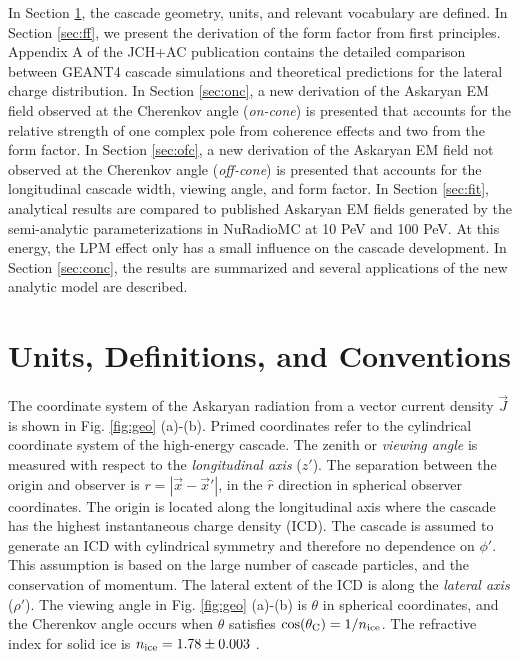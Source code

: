 \documentclass[amsmath,amssymb,aps,prd,10pt,twocolumn]{revtex4}
\begin{document}
In Section \ref{sec:unit}, the cascade geometry, units, and relevant vocabulary are defined.  In Section \ref{sec:ff}, we present the derivation of the form factor from first principles.  Appendix A of the JCH+AC publication contains the detailed comparison between GEANT4 cascade simulations and theoretical predictions for the lateral charge distribution.  In Section \ref{sec:onc}, a new derivation of the Askaryan EM field observed at the Cherenkov angle (\textit{on-cone}) is presented that accounts for the relative strength of one complex pole from coherence effects and two from the form factor.  In Section \ref{sec:ofc}, a new derivation of the Askaryan EM field not observed at the Cherenkov angle (\textit{off-cone}) is presented that accounts for the longitudinal cascade width, viewing angle, and form factor.  In Section \ref{sec:fit}, analytical results are compared to published Askaryan EM fields generated by the semi-analytic parameterizations in NuRadioMC \cite{10.1140/epjc/s10052-020-7612-8} at 10 PeV and 100 PeV.  At this energy, the LPM effect only has a small influence on the cascade development.  In Section \ref{sec:conc}, the results are summarized and several applications of the new analytic model are described.

\section{Units, Definitions, and Conventions}
\label{sec:unit}

The coordinate system of the Askaryan radiation from a vector current density $\vec{J}$ is shown in Fig. \ref{fig:geo} (a)-(b).  Primed coordinates refer to the cylindrical coordinate system of the high-energy cascade.  The zenith or \textit{viewing angle} is measured with respect to the \textit{longitudinal axis} ($z'$).  The separation between the origin and observer is $r = |\vec{x} - \vec{x}'|$, in the $\hat{r}$ direction in spherical observer coordinates.  The origin is located along the longitudinal axis where the cascade has the highest instantaneous charge density (ICD).  The cascade is assumed to generate an ICD with cylindrical symmetry and therefore no dependence on $\phi'$.  This assumption is based on the large number of cascade particles, and the conservation of momentum.  The lateral extent of the ICD is along the \textit{lateral axis} ($\rho'$).  The viewing angle in Fig. \ref{fig:geo} (a)-(b) is $\theta$ in spherical coordinates, and the Cherenkov angle occurs when $\theta$ satisfies $\cos(\theta_{\rm C}) = 1/n_{\rm ice}$.  The refractive index for solid ice is $n_{\rm ice} = 1.78 \pm 0.003$ \cite{bog}.
\end{document}

